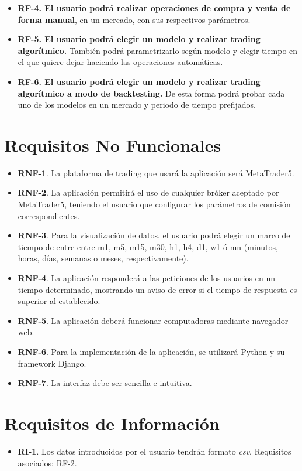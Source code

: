 \begin{titlepage}
\begin{itemize}
	\item \textbf{RF-4. El usuario podrá realizar operaciones de compra y venta de forma manual}, en un mercado, con sus respectivos parámetros.

	\item \textbf{RF-5. El usuario podrá elegir un modelo y realizar trading algorítmico.} También podrá parametrizarlo según modelo y elegir tiempo en el que quiere dejar haciendo las operaciones automáticas. 

	\item \textbf{RF-6. El usuario podrá elegir un modelo y realizar trading algorítmico a modo de backtesting.} De esta forma podrá probar cada uno de los modelos en un mercado y periodo de tiempo prefijados.
	
\end{itemize}

\section{Requisitos No Funcionales}

\begin{itemize}
	\item \textbf{RNF-1}. La plataforma de trading que usará la aplicación será MetaTrader5.
	\item \textbf{RNF-2}. La aplicación permitirá el uso de cualquier bróker aceptado por MetaTrader5, teniendo el usuario que configurar los parámetros de comisión correspondientes.
	\item \textbf{RNF-3}. Para la visualización de datos, el usuario podrá elegir un marco de tiempo de entre entre  m1, m5, m15, m30, h1, h4, d1, w1 ó mn (minutos, horas, días, semanas o meses, respectivamente).
	\item \textbf{RNF-4}. La aplicación responderá a las peticiones de los usuarios en un tiempo determinado,
	mostrando un aviso de error si el tiempo de respuesta es superior al establecido.
	\item \textbf{RNF-5}. La aplicación deberá funcionar computadoras mediante navegador web.
	\item \textbf{RNF-6}. Para la implementación de la aplicación, se utilizará Python y su framework Django.
	\item \textbf{RNF-7}. La interfaz debe ser sencilla e intuitiva.
\end{itemize}

\section{Requisitos de Información}

\begin{itemize}
	\item \textbf{RI-1}. Los datos introducidos por el usuario tendrán formato \textit{csv}. Requisitos asociados: RF-2. 
\end{itemize}

\end{titlepage}
